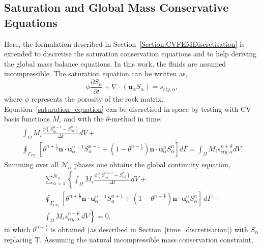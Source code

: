 \documentclass[preprint,authoryear,12pt]{elsarticle}
\begin{document}
\subsection{Saturation and Global Mass Conservative Equations}\label{Section:Saturation_Global}
Here, the formulation described in Section~\ref{Section:CVFEMDiscretisation} is extended to discretise the saturation conservation equations and to help deriving the global mass balance equations. In this work, the fluids are assumed incompressible. The saturation equation can be written as,
\begin{equation}
  \phi\displaystyle\frac{\partial S_{\alpha} }{\partial t} +   \nabla \cdot \left( {\mathbf u}_{\alpha}  S_{\alpha}\right) =  s_{cty,\alpha},
  \label{saturation_equation}
\end{equation}
where $\phi$ represents the porosity of the rock matrix. Equation~\ref{saturation_equation} can be discretised in space by testing with CV basis functions $M_{i}$ and with the $\theta$-method in time:
\begin{eqnarray}
  \int_{\Omega} M_{i} \displaystyle\frac{\phi \left({S_{\alpha i}^{n+1}}-{S_{\alpha i}^{n}}\right)}{\Delta t} dV + \nonumber \\ 
  \oint_{\Gamma_{CV_{i}}} \left[\theta^{n+\frac{1}{2}} {\mathbf n} \cdot {\mathbf u}_{\alpha}^{n+1} S_{\alpha}^{n+1} +  \left(1-\theta^{n+\frac{1}{2}}\right) {\mathbf n} \cdot {\mathbf u}_{\alpha}^{n} S_{\alpha}^{n} \right]d\Gamma =  \int_{\Omega} M_{i} {s_{cty,\alpha}^{n+\theta}} dV.
  \label{detail-sat-eqn-k}
\end{eqnarray}
Summing over all $\mathcal{N}_\alpha$ phases one obtains the global continuity equation,
\begin{eqnarray}
  \sum\limits_{\alpha=1}^{\mathcal{N}_{\alpha}} \left\lbrace \int_{\Omega} M_{i} \displaystyle\frac{\phi\left({S_{\alpha i}^{n+1}}-{S_{\alpha i}^{n}}\right) } {\Delta t} dV + \right. \nonumber \\ 
  \left. \displaystyle\oint_{{\Gamma_{CV}}_{i}} \left[\theta^{n+\frac{1}{2}} {\mathbf n} \cdot {\mathbf u}_{\alpha}^{n+1} S_{\alpha}^{n+1} +  \left(1-\theta^{n+\frac{1}{2}}\right) {\mathbf n} \cdot {\mathbf u}_{\alpha}^{n} S_{\alpha}^{n} \right] \,d\Gamma - \right. \nonumber \\
  \left. \displaystyle\int_{\Omega} M_{i} s_{cty,\alpha}^{n+\theta}\, dV \right\rbrace = 0,
           \label{detail-sat-eqn-k-sum}
\end{eqnarray}
in which $\theta^{n+\frac{1}{2}}$ is obtained (as described in Section~\ref{time_discretisation}) with $S_\alpha$ replacing T. Assuming the natural incompressible mass conservation constraint,
\end{document}
